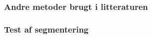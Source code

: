\subsubsection*{Andre metoder brugt i litteraturen}

\subsubsection*{Test af segmentering}

\begin{comment}
Se nrpl.dk: Hvert af de op til 7 tegn på nummerpladen har et imaginært "felt" de kan brede sig i. Ikke alle tegn er lige brede, og generelt er bogstaver bredere end tal. "Feltet" til bogstaver er derfor bredere end feltet til tegn. Enkelte tegn er for smalle til at udfylde deres "felt", så designeren har fundet det hensigtsmæssigt at placere disse tegn visuelt centreret inden for deres "felt".

"Således vil en nummerplade som MB 20 001 på grund af venstrestillingen af det sidste 1-tal have større mellemrum mellem højre kant og sidste tal end mellem venstre kant og første bogstav"
\end{comment}


